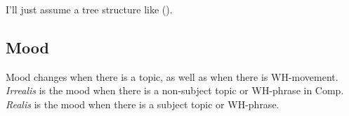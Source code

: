 \documentclass[12pt]{article}
\begin{document}
I'll just assume a tree structure like ().

{\small
{}
}

\subsection{Mood}

Mood changes when there is a topic, as well as when
there is WH-movement.  \emph{Irrealis} is the mood when
there is a non-subject topic or WH-phrase in Comp.
\emph{Realis} is the mood when there is a subject topic
or WH-phrase.
\end{document}
